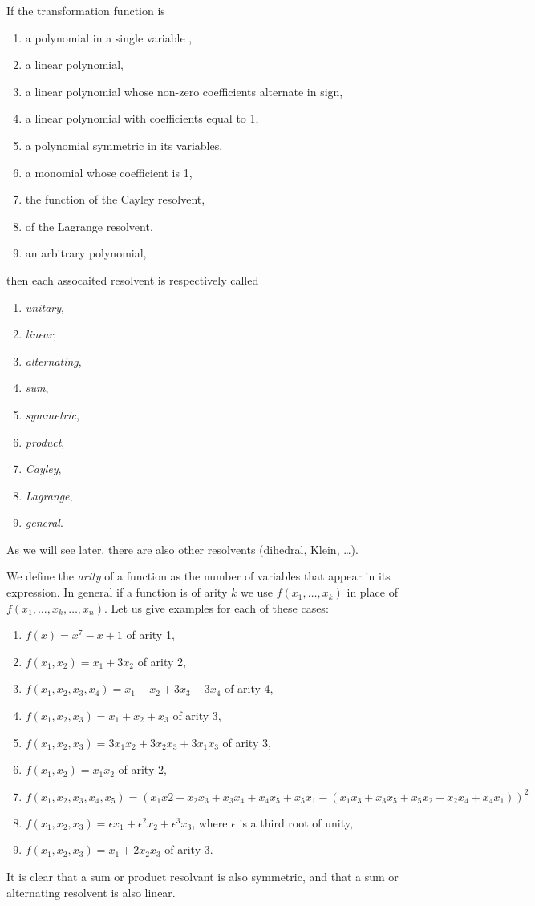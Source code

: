 \documentclass[11pt]{article}
\begin{document}
If the transformation function is
\begin{enumerate}
  \item a polynomial in a single variable ,
  \item a linear polynomial,
  \item a linear polynomial whose non-zero coefficients alternate in sign,
  \item a linear polynomial with coefficients equal to 1,
  \item a polynomial symmetric in its variables,
  \item a monomial whose coefficient is 1,
  \item the function of the Cayley resolvent,
  \item of the Lagrange resolvent,
  \item an arbitrary polynomial,
\end{enumerate}
then each assocaited resolvent is respectively called
\begin{enumerate}
  \item \textit{unitary},
  \item \textit{linear},
  \item \textit{alternating},
  \item \textit{sum},
  \item \textit{symmetric},
  \item \textit{product},
  \item \textit{Cayley},
  \item \textit{Lagrange},
  \item \textit{general}.
\end{enumerate}
As we will see later, there are also other resolvents (dihedral, Klein, \dots).

We define the \textit{arity} of a function as the number of variables that
appear in its expression.  In general if a function is of arity $k$ we use
$f(x_1,\ldots,x_k)$ in place of $f(x_1,\ldots ,x_k ,\ldots ,x_n)$. Let us give
examples for each of these cases:
\begin{enumerate}
  \item $f(x)=x^7-x+1$ of arity 1,
  \item $f(x_1,x_2) = x_1+3x_2$ of arity 2,
  \item $f(x_1,x_2,x_3,x_4) = x_1 -x_2 + 3x_3-3x_4$ of arity 4,
  \item $f(x_1,x_2,x_3) = x_1+x_2+x_3$ of arity 3,
  \item $f(x_1,x_2,x_3) = 3x_1x_2 + 3x_2x_3 +3x_1x_3$ of arity 3,
  \item $f(x_1,x_2) =x_1x_2$ of arity 2,
  \item $f(x_1,x_2,x_3,x_4,x_5)=(x_1x2+x_2x_3+x_3x_4+x_4x_5+x_5x_1 -
  (x_1x_3+x_3x_5+x_5x_2+x_2x_4+x_4x_1))^2$
  \item $f(x_1,x_2,x_3) = \epsilon x_1 + \epsilon^2 x_2 + \epsilon^3 x_3$, where
  $\epsilon$ is a third root of unity,
  \item $f(x_1,x_2,x_3) = x_1 +2x_2x_3$ of arity 3.
\end{enumerate}
It is clear that a sum or product resolvant is also symmetric, and that a sum or
alternating resolvent is also linear.
\end{document}
